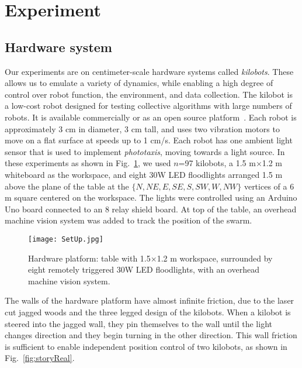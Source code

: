 
\section{Experiment}\label{sec:expResults}



\subsection{Hardware system}


Our experiments are on centimeter-scale hardware systems called \emph{kilobots}.  These allows us to emulate a variety of dynamics, while enabling a high degree of control over robot function, the environment, and data collection. The kilobot \citet{Rubenstein2012,rubenstein2014programmable} is a low-cost robot designed for testing collective algorithms with large numbers of robots. It is available commercially or as an open source platform~\citet{K-Team2015}.  Each robot is approximately 3 cm in diameter, 3 cm tall, and uses two vibration motors to move on a flat surface at speeds up to 1 cm/s.  Each robot has one ambient light sensor that is used to implement \emph{phototaxis},  moving towards a light source. 
In these experiments as shown in Fig.~\ref{fig:setup}, we used $n$=97 kilobots, a 1.5 m$\times$1.2 m whiteboard as the workspace, and eight 30W LED floodlights arranged 1.5 m above the plane of the table at the $\{N,NE,E,SE,S,SW,W,NW\}$ vertices of a 6 m square centered on the workspace. The lights were controlled using an Arduino Uno board connected to an 8 relay shield board.  At top of the table, an overhead machine vision system was added to track the position of the swarm.


\begin{figure}
\begin{center}
	\texttt{[image: SetUp.jpg]}
\end{center}
\caption{\label{fig:setup}
Hardware platform:  table with 1.5$\times$1.2 m workspace, surrounded by eight remotely triggered 30W LED floodlights, with an overhead machine vision system.
}
\end{figure}

The walls of the hardware platform have almost infinite friction, due to the laser cut jagged woods and the three legged design of the kilobots. When a kilobot is steered into the jagged wall, they pin themselves to the wall until the light changes direction and they begin turning in the other direction.  This wall friction is sufficient to enable independent position control of two kilobots, as shown in Fig.~\ref{fig:storyReal}.



